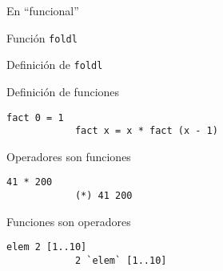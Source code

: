 \documentclass[12pt]{beamer}
\begin{document}
\begin{frame}[fragile]
    \begin{block}{En ``funcional''}
        
    \end{block}
\end{frame}

\begin{frame}[fragile]
    \begin{block}{Función \lstinline[style=hs]!foldl!}
        
    \end{block}
\end{frame}

\begin{frame}[fragile]
    \begin{block}{Definición de \lstinline[style=hs]!foldl!}
        
    \end{block}
\end{frame}

\begin{frame}[fragile]
    \begin{block}{Definición de funciones}
        \begin{lstlisting}[style=hs,gobble=12]
            fact 0 = 1
            fact x = x * fact (x - 1)
        \end{lstlisting}
    \end{block}
    \pause
    \begin{block}{Operadores son funciones}
        \begin{lstlisting}[style=hs,gobble=12]
            41 * 200
            (*) 41 200
        \end{lstlisting}
    \end{block}
    \pause
    \begin{block}{Funciones son operadores}
        \begin{lstlisting}[style=hs,gobble=12]
            elem 2 [1..10]
            2 `elem` [1..10]
        \end{lstlisting}
    \end{block}
\end{frame}
\end{document}
